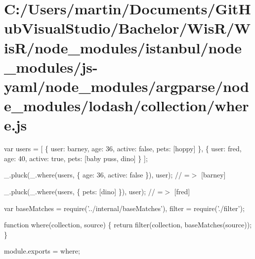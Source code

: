 \hypertarget{_c_1_2_users_2martin_2_documents_2_git_hub_visual_studio_2_bachelor_2_wis_r_2_wis_r_2node_module3b81d267372e87b7042bafe9f538d7cf}{}\section{C\+:/\+Users/martin/\+Documents/\+Git\+Hub\+Visual\+Studio/\+Bachelor/\+Wis\+R/\+Wis\+R/node\+\_\+modules/istanbul/node\+\_\+modules/js-\/yaml/node\+\_\+modules/argparse/node\+\_\+modules/lodash/collection/where.\+js}
var users = \mbox{[} \{ \textquotesingle{}user\textquotesingle{}\+: \textquotesingle{}barney\textquotesingle{}, \textquotesingle{}age\textquotesingle{}\+: 36, \textquotesingle{}active\textquotesingle{}\+: false, \textquotesingle{}pets\textquotesingle{}\+: \mbox{[}\textquotesingle{}hoppy\textquotesingle{}\mbox{]} \}, \{ \textquotesingle{}user\textquotesingle{}\+: \textquotesingle{}fred\textquotesingle{}, \textquotesingle{}age\textquotesingle{}\+: 40, \textquotesingle{}active\textquotesingle{}\+: true, \textquotesingle{}pets\textquotesingle{}\+: \mbox{[}\textquotesingle{}baby puss\textquotesingle{}, \textquotesingle{}dino\textquotesingle{}\mbox{]} \} \mbox{]};

\+\_\+.\+pluck(\+\_\+.\+where(users, \{ \textquotesingle{}age\textquotesingle{}\+: 36, \textquotesingle{}active\textquotesingle{}\+: false \}), \textquotesingle{}user\textquotesingle{}); // =$>$ \mbox{[}\textquotesingle{}barney\textquotesingle{}\mbox{]}

\+\_\+.\+pluck(\+\_\+.\+where(users, \{ \textquotesingle{}pets\textquotesingle{}\+: \mbox{[}\textquotesingle{}dino\textquotesingle{}\mbox{]} \}), \textquotesingle{}user\textquotesingle{}); // =$>$ \mbox{[}\textquotesingle{}fred\textquotesingle{}\mbox{]}


\begin{DoxyCodeInclude}
var baseMatches = require(\textcolor{stringliteral}{'../internal/baseMatches'}),
    filter = require(\textcolor{stringliteral}{'./filter'});

\textcolor{keyword}{function} where(collection, source) \{
  \textcolor{keywordflow}{return} filter(collection, baseMatches(source));
\}

module.exports = where;
\end{DoxyCodeInclude}
 